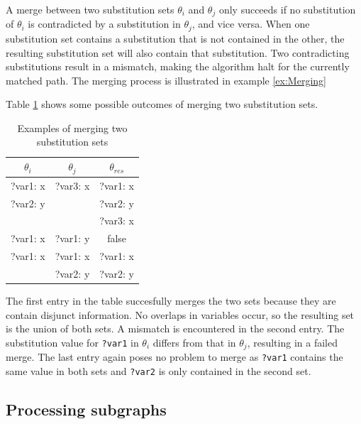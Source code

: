 A merge between two substitution sets $\theta_i$ and $\theta_j$ only succeeds if no substitution of $\theta_i$ is contradicted by a substitution in $\theta_j$, and vice versa. When one substitution set contains a substitution that is not contained in the other, the resulting substitution set will also contain that substitution. Two contradicting substitutions result in a mismatch, making the algorithm halt for the currently matched path. The merging process is illustrated in example \ref{ex:Merging}
\begin{exmp}
\label{ex:Merging}
Table \ref{tab:merging} shows some possible outcomes of merging two substitution sets.

\begin{table}[!h]
\centering
  \begin{tabular}{| c | c | c |}
  \hline
  $\theta_i$ & $\theta_j$ & $\theta_{res}$\\
  \hline \hline
  ?var1: x & ?var3: x & ?var1: x\\
  ?var2: y &  & ?var2: y\\
  &  & ?var3: x\\
  \hline
  ?var1: x & ?var1: y & false\\
  \hline
  ?var1: x & ?var1: x & ?var1: x\\
  & ?var2: y & ?var2: y \\
  \hline

  \end{tabular}
  
  \caption{Examples of merging two substitution sets}
  \label{tab:merging}
\end{table}

 The first entry in the table succesfully merges the two sets because they are contain disjunct information. No overlaps in variables occur, so the resulting set is the union of both sets. A mismatch is encountered in the second entry. The substitution value for \texttt{?var1} in $\theta_i$ differs from that in $\theta_j$, resulting in a failed merge. The last entry again poses no problem to merge as \texttt{?var1} contains the same value in both sets and \texttt{?var2} is only contained in the second set.

\end{exmp}
\subsection{Processing subgraphs}
\label{subsec:subgraphs}

